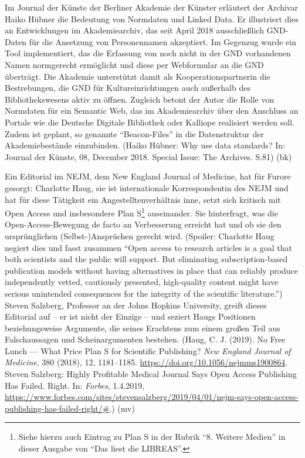 \documentclass[a4paper,
fontsize=11pt,
oneside,
numbers=noperiodatend,
parskip=half-,
bibliography=totoc,
final
]{scrartcl}
\begin{document}
Im Journal der Künste der Berliner Akademie der Künster erläutert der
Archivar Haiko Hübner die Bedeutung von Normdaten und Linked Data. Er
illustriert dies an Entwicklungen im Akademiearchiv, das seit April 2018
ausschließlich GND-Daten für die Ansetzung von Personennamen akzeptiert.
Im Gegenzug wurde ein Tool implementiert, das die Erfassung von noch
nicht in der GND vorhandenen Namen normgerecht ermöglicht und diese per
Webformular an die GND überträgt. Die Akademie unterstützt damit als
Kooperationspartnerin die Bestrebungen, die GND für Kultureinrichtungen
auch außerhalb des Bibliothekswesens aktiv zu öffnen. Zugleich betont
der Autor die Rolle von Normdaten für ein Semantic Web, das im
Akademiearchiv über den Anschluss an Portale wie die Deutsche Digitale
Bibliothek oder Kalliope realisiert werden soll. Zudem ist geplant, so
genannte \enquote{Beacon-Files} in die Datenstruktur der
Akademiebestände einzubinden. (Haiko Hübner: Why use data standards? In:
Journal der Künste, 08, December 2018. Special Issue: The Archives.
S.81) (bk)

Ein Editorial im NEJM, dem New England Journal of Medicine, hat für
Furore gesorgt: Charlotte Haug, sie ist internationale Korrespondentin
des NEJM und hat für diese Tätigkeit ein Angestelltenverhältnis inne,
setzt sich kritisch mit Open Access und insbesondere Plan S\footnote{Siehe
  hierzu auch Eintrag zu Plan S in der Rubrik \enquote{8. Weitere
  Medien} in dieser Ausgabe von \enquote{Das liest die LIBREAS}.}
auseinander. Sie hinterfragt, was die Open-Access-Bewegung de facto an
Verbesserung erreicht hat und ob sie den ursprünglichen
(Selbst-)Ansprüchen gerecht wird. (Spoiler: Charlotte Haug negiert dies
und fasst zusammen \enquote{Open access to research articles is a goal
that both scientists and the public will support. But eliminating
subscription-based publication models without having alternatives in
place that can reliably produce independently vetted, cautiously
presented, high-quality content might have serious unintended
consequences for the integrity of the scientific literature.}) Steven
Salzberg, Professor an der Johns Hopkins University, greift dieses
Editorial auf -- er ist nicht der Einzige -- und seziert Haugs
Positionen beziehungsweise Argumente, die seines Erachtens zum einem
großen Teil aus Falschaussagen und Scheinargumenten bestehen. (Haug, C.
J. (2019). No Free Lunch --- What Price Plan S for Scientific
Publishing? \emph{New England Journal of Medicine}, 380 (2018), 12,
1181--1185. \url{https://doi.org/10.1056/nejmms1900864}. Steven
Salzberg: Highly Profitable Medical Journal Says Open Access Publishing
Has Failed. Right. In: \emph{Forbes}, 1.4.2019,
\url{https://www.forbes.com/sites/stevensalzberg/2019/04/01/nejm-says-open-access-publishing-has-failed-right/\#}.)
(mv)
\end{document}
